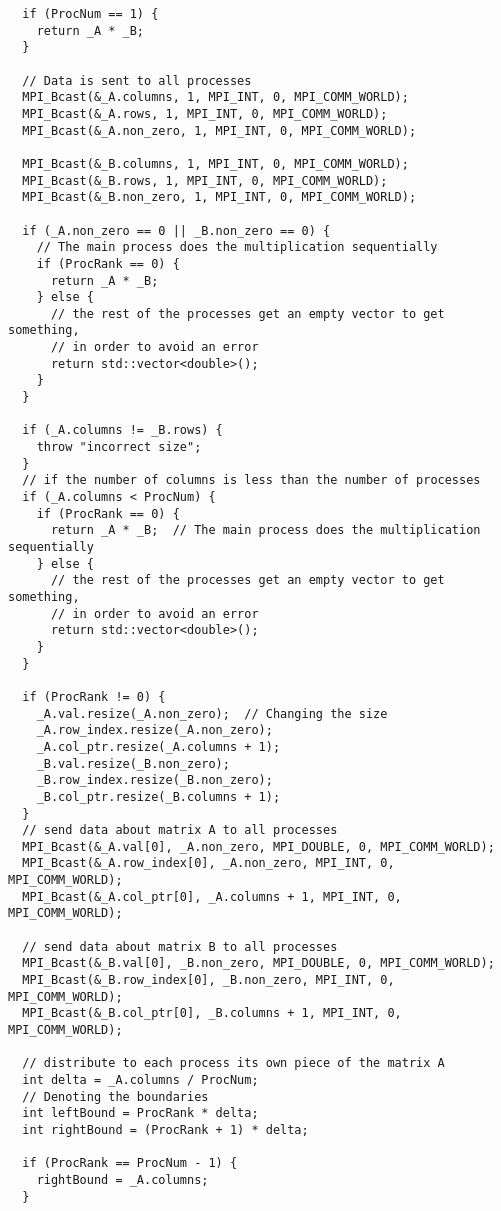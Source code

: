 \documentclass[12pt,a4paper]{article}
\begin{document}
\begin{lstlisting}
  if (ProcNum == 1) {
    return _A * _B;
  }

  // Data is sent to all processes
  MPI_Bcast(&_A.columns, 1, MPI_INT, 0, MPI_COMM_WORLD);
  MPI_Bcast(&_A.rows, 1, MPI_INT, 0, MPI_COMM_WORLD);
  MPI_Bcast(&_A.non_zero, 1, MPI_INT, 0, MPI_COMM_WORLD);

  MPI_Bcast(&_B.columns, 1, MPI_INT, 0, MPI_COMM_WORLD);
  MPI_Bcast(&_B.rows, 1, MPI_INT, 0, MPI_COMM_WORLD);
  MPI_Bcast(&_B.non_zero, 1, MPI_INT, 0, MPI_COMM_WORLD);

  if (_A.non_zero == 0 || _B.non_zero == 0) {
    // The main process does the multiplication sequentially
    if (ProcRank == 0) {
      return _A * _B;
    } else {
      // the rest of the processes get an empty vector to get something,
      // in order to avoid an error
      return std::vector<double>();
    }
  }

  if (_A.columns != _B.rows) {
    throw "incorrect size";
  }
  // if the number of columns is less than the number of processes
  if (_A.columns < ProcNum) {
    if (ProcRank == 0) {
      return _A * _B;  // The main process does the multiplication sequentially
    } else {
      // the rest of the processes get an empty vector to get something,
      // in order to avoid an error
      return std::vector<double>();
    }
  }

  if (ProcRank != 0) {
    _A.val.resize(_A.non_zero);  // Changing the size
    _A.row_index.resize(_A.non_zero);
    _A.col_ptr.resize(_A.columns + 1);
    _B.val.resize(_B.non_zero);
    _B.row_index.resize(_B.non_zero);
    _B.col_ptr.resize(_B.columns + 1);
  }
  // send data about matrix A to all processes
  MPI_Bcast(&_A.val[0], _A.non_zero, MPI_DOUBLE, 0, MPI_COMM_WORLD);
  MPI_Bcast(&_A.row_index[0], _A.non_zero, MPI_INT, 0, MPI_COMM_WORLD);
  MPI_Bcast(&_A.col_ptr[0], _A.columns + 1, MPI_INT, 0, MPI_COMM_WORLD);

  // send data about matrix B to all processes
  MPI_Bcast(&_B.val[0], _B.non_zero, MPI_DOUBLE, 0, MPI_COMM_WORLD);
  MPI_Bcast(&_B.row_index[0], _B.non_zero, MPI_INT, 0, MPI_COMM_WORLD);
  MPI_Bcast(&_B.col_ptr[0], _B.columns + 1, MPI_INT, 0, MPI_COMM_WORLD);

  // distribute to each process its own piece of the matrix A
  int delta = _A.columns / ProcNum;
  // Denoting the boundaries
  int leftBound = ProcRank * delta;
  int rightBound = (ProcRank + 1) * delta;

  if (ProcRank == ProcNum - 1) {
    rightBound = _A.columns;
  }


\end{lstlisting}
\end{document}
